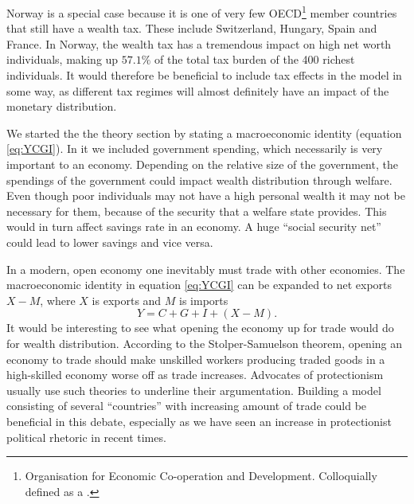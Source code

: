 \documentclass[10pt, a4paper]{amsart}
\begin{document}
Norway is a special case because it is one of very few OECD\footnote{Organisation for Economic Co-operation and Development. Colloquially defined as a .} member countries that still have a wealth tax. These include Switzerland, Hungary, Spain and France\cite{OECD}. In Norway, the wealth tax has a tremendous impact on high net worth individuals, making up $57.1\%$ of the total tax burden of the 400 richest individuals\cite{NHHmaster}. It would therefore be beneficial to include tax effects in the model in some way, as different tax regimes will almost definitely have an impact of the monetary distribution.

We started the the theory section by stating a macroeconomic identity (equation \ref{eq:YCGI}). In it we included government spending, which necessarily is very important to an economy. Depending on the relative size of the government, the spendings of the government could impact wealth distribution through welfare. Even though poor individuals may not have a high personal wealth it may not be necessary for them, because of the security that a welfare state provides. This would in turn affect savings rate in an economy. A huge ``social security net'' could lead to lower savings and vice versa.

In a modern, open economy one inevitably must trade with other economies. The macroeconomic identity in equation \ref{eq:YCGI} can be expanded to net exports $X-M$, where $X$ is exports and $M$ is imports
\begin{equation}
Y = C + G + I + (X-M).
\end{equation}
It would be interesting to see what opening the economy up for trade would do for wealth distribution. According to the Stolper-Samuelson theorem, opening an economy to trade should make unskilled workers producing traded goods in a high-skilled economy worse off as trade increases\cite{StolperSamuelson}. Advocates of protectionism usually use such theories to underline their argumentation. Building a model consisting of several ``countries'' with increasing amount of trade could be beneficial in this debate, especially as we have seen an increase in protectionist political rhetoric in recent times.
		
\end{document}
